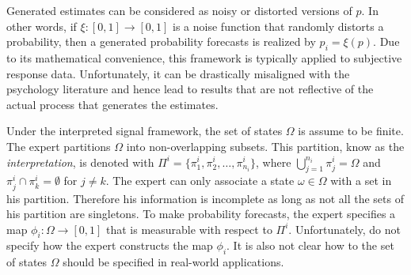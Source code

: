 \documentclass[11pt,twoside]{article}
\begin{document}
Generated estimates can be considered as noisy or distorted versions of $p$. In other words, if $\xi: [0,1] \to [0,1]$ is a noise function that randomly distorts a probability, then a generated probability forecasts is realized by $p_i = \xi(p)$. Due to its mathematical convenience, this framework is typically applied to subjective response data. Unfortunately, it can be drastically misaligned with the psychology literature and hence lead to results that are not reflective of the actual process that generates the estimates.

Under the interpreted signal framework, the set of states $\Omega$ is assume to be finite. The expert partitions $\Omega$ into non-overlapping subsets. This partition, know as the \textit{interpretation}, is denoted with $\Pi^i = \{\pi_1^i, \pi_2^i, \dots, \pi_{n_i}^i\}$, where $\bigcup_{j=1}^{n_i} \pi_j^i = \Omega$ and  $\pi_j^i \cap \pi_k^i = \emptyset$ for $j \neq k$. The expert can only associate a state $\omega \in \Omega$ with a set in his partition. Therefore his information is incomplete as long as not all the sets of his partition are singletons. To make probability forecasts, the expert specifies a map $\phi_i: \Omega \to [0, 1]$ that is measurable with respect to $\Pi^i$. 
Unfortunately, \cite{hong2009interpreted} do not specify how the expert constructs the map $\phi_i$. It is also not clear how to the set of states $\Omega$ should be specified in real-world applications.  
\end{document}
